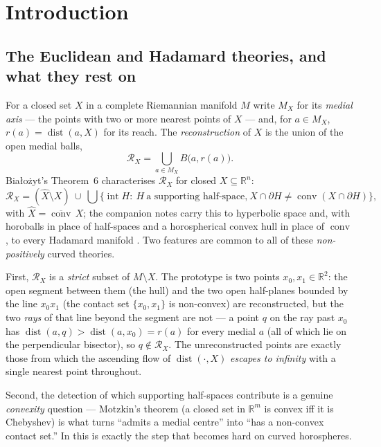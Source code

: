 \documentclass[11pt]{article}
\theoremstyle{remark}
\newcommand{\R}{\mathbb{R}}
\newcommand{\X}{X}
\newcommand{\Xhat}{\widehat{\X}}
\newcommand{\Mx}{M_{\X}}
\newcommand{\Rx}{\mathcal{R}_{\X}}
\newcommand{\dist}{\operatorname{dist}}
\newcommand{\conv}{\operatorname{conv}}
\begin{document}
\tableofcontents

\section{Introduction}\label{sec:intro}

\subsection*{The Euclidean and Hadamard theories, and what they rest on}

For a closed set $\X$ in a complete Riemannian manifold $M$ write $\Mx$
for its \emph{medial axis} --- the points with two or more nearest points
of $\X$ --- and, for $a\in\Mx$, $r(a)=\dist(a,\X)$ for its reach. The
\emph{reconstruction} of $\X$ is the union of the open medial balls,
\[
  \Rx=\bigcup_{a\in\Mx}B\!\bigl(a,r(a)\bigr).
\]
Bia\l{}o\.zyt's Theorem~6 \cite{Bia} characterises $\Rx$ for closed
$\X\subseteq\R^{n}$:
\begin{equation}\label{eq:bia}
  \Rx=(\Xhat\setminus\X)\ \cup\
  \bigcup\bigl\{\operatorname{int}H:\ H\ \text{a supporting half-space,}\
  \X\cap\partial H\neq\conv(\X\cap\partial H)\bigr\},
\end{equation}
with $\Xhat=\overline{\conv}\,\X$; the companion notes carry this to
hyperbolic space \cite{R2} and, with horoballs in place of half-spaces
and a horospherical convex hull in place of $\conv$, to every Hadamard
manifold \cite{R1,R3}. Two features are common to all of these
\emph{non-positively} curved theories.

First, $\Rx$ is a \emph{strict} subset of $M\setminus\X$. The
prototype is two points $x_{0},x_{1}\in\R^{2}$: the open segment between
them (the hull) and the two open half-planes bounded by the line
$x_{0}x_{1}$ (the contact set $\{x_{0},x_{1}\}$ is non-convex) are
reconstructed, but the two \emph{rays} of that line beyond the segment are
not --- a point $q$ on the ray past $x_{0}$ has $\dist(a,q)>\dist(a,x_{0})
=r(a)$ for every medial $a$ (all of which lie on the perpendicular
bisector), so $q\notin\Rx$. The unreconstructed points are exactly those
from which the ascending flow of $\dist(\cdot,\X)$ \emph{escapes to
infinity} with a single nearest point throughout.

Second, the detection of which supporting half-spaces contribute is a
genuine \emph{convexity} question --- Motzkin's theorem (a closed set in
$\R^{m}$ is convex iff it is Chebyshev) is what turns
``admits a medial centre'' into ``has a non-convex contact set.'' In
\cite{R3} this is exactly the step that becomes hard on curved
horospheres.
\end{document}
